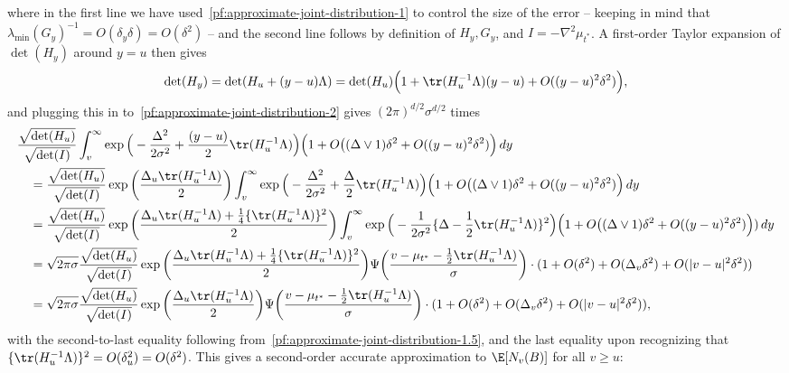 \documentclass{article}
\begin{document}
	where in the first line we have used~\eqref{pf:approximate-joint-distribution-1} to control the size of the error -- keeping in mind that $\lambda_{\min}(G_y)^{-1} = O(\delta_y \delta) = O(\delta^2)$ -- and the second line follows by definition of $H_y, G_y$, and $I = -\nabla^2 \mu_{t^*}$. A first-order Taylor expansion of $\det(H_y)$ around $y = u$ then gives
	\begin{equation*}
		\det(H_y) = \det(H_u + (y - u)\Lambda) = \det(H_u)\Big(1 + \tr(H_u^{-1}\Lambda) (y - u) + O((y - u)^2\delta^2)\Big),
	\end{equation*}
	and plugging this in to~\eqref{pf:approximate-joint-distribution-2} gives $(2\pi)^{d/2}\sigma^{d/2}$ times
	\begin{align*}
		& \frac{\sqrt{\det(H_u)}}{\sqrt{\det(I)}}\int_{v}^{\infty} \exp\Big(-\frac{\Delta^2}{2\sigma^2} + \frac{(y - u)}{2}\tr(H_u^{-1}\Lambda)\Big) \Big(1 + O\big((\Delta \vee 1)\delta^2 + O((y - u)^2\delta^2)\Big) \,dy \\
		& \quad = \frac{\sqrt{\det(H_u)}}{\sqrt{\det(I)}} \exp\bigg(\frac{\Delta_u \tr(H_u^{-1}\Lambda)}{2}\bigg) \int_{v}^{\infty} \exp\Big(-\frac{\Delta^2}{2\sigma^2} + \frac{\Delta}{2}\tr(H_u^{-1}\Lambda)\Big) \Big(1 + O\big((\Delta \vee 1)\delta^2 + O((y - u)^2\delta^2)\Big) \,dy \\
		& \quad = \frac{\sqrt{\det(H_u)}}{\sqrt{\det(I)}} \exp\bigg(\frac{\Delta_u \tr(H_u^{-1}\Lambda) + \frac{1}{4}\{\tr(H_u^{-1}\Lambda)\}^2}{2}\bigg) \int_{v}^{\infty} \exp\Big(-\frac{1}{2\sigma^2}\{\Delta - \frac{1}{2}\tr(H_u^{-1}\Lambda)\}^2\Big)  \Big(1 + O\big((\Delta \vee 1)\delta^2 + O((y - u)^2\delta^2)\Big)) \,dy \\
		& \quad = \sqrt{2\pi \sigma} \frac{\sqrt{\det(H_u)}}{\sqrt{\det(I)}} \exp\bigg(\frac{\Delta_u \tr(H_u^{-1}\Lambda) + \frac{1}{4}\{\tr(H_u^{-1}\Lambda)\}^2}{2}\bigg) \Psi\bigg(\frac{v - \mu_{t^*} - \frac{1}{2}\tr(H_u^{-1}\Lambda)}{\sigma}\bigg) \cdot (1 + O(\delta^2) + O(\Delta_v\delta^2) + O(|v - u|^2 \delta^2)) \\
		& \quad = \sqrt{2\pi\sigma} \frac{\sqrt{\det(H_u)}}{\sqrt{\det(I)}} \exp\bigg(\frac{\Delta_u \tr(H_u^{-1}\Lambda)}{2}\bigg) \Psi\bigg(\frac{v - \mu_{t^*} - \frac{1}{2}\tr(H_u^{-1}\Lambda)}{\sigma}\bigg) \cdot (1 + O(\delta^2) + O(\Delta_v\delta^2) + O(|v - u|^2 \delta^2)),
	\end{align*}
	with the second-to-last equality following from~\eqref{pf:approximate-joint-distribution-1.5}, and the last equality upon recognizing that $\{\tr(H_u^{-1}\Lambda)\}^2 = O(\delta_u^2) = O(\delta^2)$. This gives a second-order accurate approximation to $\E[N_v(B)]$ for all $v \geq u$:
\end{document}

